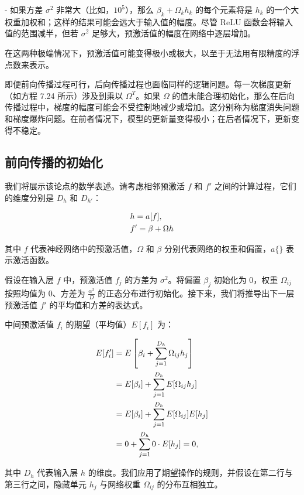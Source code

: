 - 如果方差 \(\sigma^2\) 非常大（比如，\(10^5\)），那么 \(\beta_k + \Omega_k h_k\) 的每个元素将是 \(h_k\) 的一个大权重加权和；这样的结果可能会远大于输入值的幅度。尽管 ReLU 函数会将输入值的范围减半，但若 \(\sigma^2\) 足够大，预激活值的幅度在网络中逐层增加。

在这两种极端情况下，预激活值可能变得极小或极大，以至于无法用有限精度的浮点数来表示。

即便前向传播过程可行，后向传播过程也面临同样的逻辑问题。每一次梯度更新（如方程 7.24 所示）涉及到乘以 \(\Omega^T\)。如果 \(\Omega\) 的值未能合理初始化，那么在后向传播过程中，梯度的幅度可能会不受控制地减少或增加。这分别称为梯度消失问题和梯度爆炸问题。在前者情况下，模型的更新量变得极小；在后者情况下，更新变得不稳定。

\subsection{前向传播的初始化}
我们将展示该论点的数学表述。请考虑相邻预激活 \(f\) 和 \(f'\) 之间的计算过程，它们的维度分别是 \(D_h\) 和 \(D_{h'}\)：


\begin{align}
&h = a[f], \notag \\
&f' = \beta + \Omega h 
\end{align} 


其中 \(f\) 代表神经网络中的预激活值，\(\Omega\) 和 \(\beta\) 分别代表网络的权重和偏置，\(a\{\}\) 表示激活函数。

假设在输入层 \(f\) 中，预激活值 \(f_j\) 的方差为 \(\sigma^2\)。将偏置 \(\beta_j\) 初始化为 0，权重 \(\Omega_{ij}\) 按照均值为 0、方差为 \(\frac{\alpha^2}{D}\) 的正态分布进行初始化。接下来，我们将推导出下一层预激活值 \(f'\) 的平均值和方差的表达式。

中间预激活值 \(f_i\) 的期望（平均值）\(E[f_i]\) 为：



\begin{align}
E[f_i^\prime] &= E\left[\beta_i + \sum_{j=1}^{D_h} \Omega_{ij}h_j \right] \notag  \\
&= E[\beta_i] + \sum_{j=1}^{D_h} E[\Omega_{ij}h_j] \notag \\
&= E[\beta_i] + \sum_{j=1}^{D_h} E[\Omega_{ij}] E[h_j] \notag \\
&= 0 + \sum_{j=1}^{D_h} 0 \cdot E[h_j] = 0 , 
\end{align}


其中 \(D_h\) 代表输入层 \(h\) 的维度。我们应用了期望操作的规则，并假设在第二行与第三行之间，隐藏单元 \(h_j\) 与网络权重 \(\Omega_{ij}\) 的分布互相独立。


